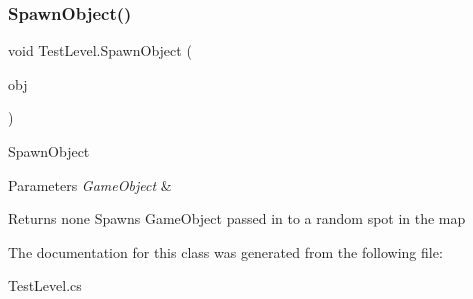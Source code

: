 \subsubsection{\texorpdfstring{Spawn\+Object()}{SpawnObject()}}
{\footnotesize\ttfamily void Test\+Level.\+Spawn\+Object (\begin{DoxyParamCaption}\item[{Game\+Object}]{obj }\end{DoxyParamCaption})\hspace{0.3cm}{\ttfamily [inline]}}

Spawn\+Object 
\begin{DoxyParams}{Parameters}
{\em Game\+Object} & \\
\hline
\end{DoxyParams}
\begin{DoxyReturn}{Returns}
none Spawns Game\+Object passed in to a random spot in the map 
\end{DoxyReturn}


The documentation for this class was generated from the following file\+:\begin{DoxyCompactItemize}
\item 
Test\+Level.\+cs\end{DoxyCompactItemize}
